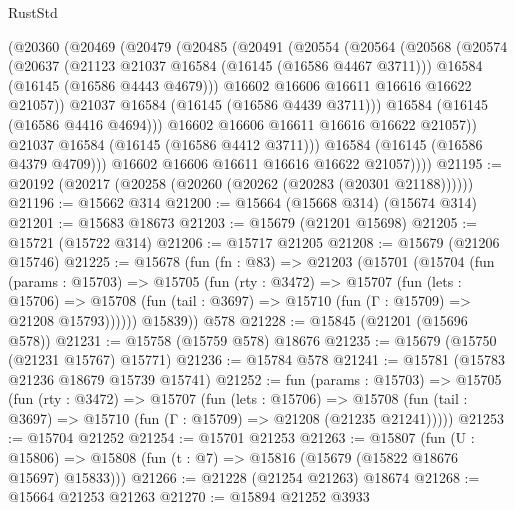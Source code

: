 \begin{lexlean}{RustStd}
\begin{coremodule}
          (@20360
            (@20469
              (@20479
                (@20485
                  (@20491
                    (@20554
                      (@20564
                        (@20568
                          (@20574
                            (@20637
                              (@21123 @21037 @16584 (@16145 (@16586 @4467 @3711)))
                              @16584
                              (@16145 (@16586 @4443 @4679)))
                            @16602
                            @16606
                            @16611
                            @16616
                            @16622
                            @21057))
                        @21037
                        @16584
                        (@16145 (@16586 @4439 @3711)))
                      @16584
                      (@16145 (@16586 @4416 @4694)))
                    @16602
                    @16606
                    @16611
                    @16616
                    @16622
                    @21057))
                @21037
                @16584
                (@16145 (@16586 @4412 @3711)))
              @16584
              (@16145 (@16586 @4379 @4709)))
            @16602
            @16606
            @16611
            @16616
            @16622
            @21057))))
@21195 := @20192 (@20217 (@20258 (@20260 (@20262 (@20283 (@20301 @21188))))))
@21196 := @15662 @314
@21200 := @15664 (@15668 @314) (@15674 @314)
@21201 := @15683 @18673
@21203 := @15679 (@21201 @15698)
@21205 := @15721 (@15722 @314)
@21206 := @15717 @21205
@21208 := @15679 (@21206 @15746)
@21225 := @15678
    (fun (fn : @83) =>
    @21203
      (@15701
        (@15704
          (fun (params : @15703) =>
          @15705
            (fun (rty : @3472) =>
            @15707
              (fun (lets : @15706) =>
              @15708 (fun (tail : @3697) => @15710 (fun (Γ : @15709) => @21208 @15793))))))
        @15839))
    @578
@21228 := @15845 (@21201 (@15696 @578))
@21231 := @15758 (@15759 @578) @18676
@21235 := @15679 (@15750 (@21231 @15767) @15771)
@21236 := @15784 @578
@21241 := @15781 (@15783 @21236 @18679 @15739 @15741)
@21252 := fun (params : @15703) =>
  @15705
    (fun (rty : @3472) =>
    @15707
      (fun (lets : @15706) =>
      @15708 (fun (tail : @3697) => @15710 (fun (Γ : @15709) => @21208 (@21235 @21241)))))
@21253 := @15704 @21252
@21254 := @15701 @21253
@21263 := @15807
    (fun (U : @15806) => @15808 (fun (t : @7) => @15816 (@15679 (@15822 @18676 @15697) @15833)))
@21266 := @21228 (@21254 @21263) @18674
@21268 := @15664 @21253 @21263
@21270 := @15894 @21252 @3933

\end{coremodule}
\end{lexlean}
